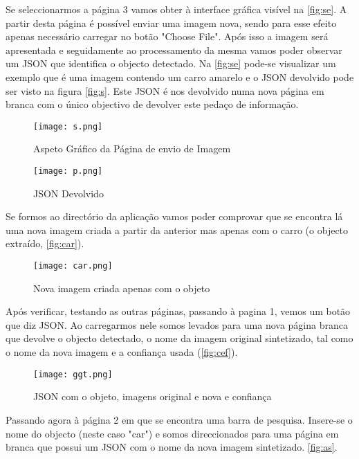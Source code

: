 \documentclass{report}
\begin{document}
Se seleccionarmos a página 3 vamos obter à interface gráfica visível na \autoref{fig:se}. A partir desta página é possível enviar uma imagem nova, sendo para esse efeito apenas necessário carregar no botão "Choose File". Após isso a imagem será apresentada e seguidamente ao processamento da mesma vamos poder observar um JSON que identifica o objecto detectado. Na \autoref{fig:se} pode-se visualizar um exemplo que é uma imagem contendo um carro amarelo e o JSON devolvido pode ser visto na figura \autoref{fig:s}. Este JSON é nos devolvido numa nova página em branca com o único objectivo de devolver este pedaço de informação.

\begin{figure}[h]
\center %
\texttt{[image: s.png]}
\caption{Aspeto Gráfico da Página de envio de Imagem}
\label{fig:se}
\end{figure}


\begin{figure}[h]
\center %
\texttt{[image: p.png]}
\caption{JSON Devolvido}
\label{fig:s}
\end{figure}

Se formos ao directório da aplicação vamos poder comprovar que se encontra lá uma nova imagem criada a partir da anterior mas apenas com o carro (o objecto extraído, \autoref{fig:car}).

\begin{figure}[h]
\center %
\texttt{[image: car.png]}
\caption{Nova imagem criada apenas com o objeto}
\label{fig:car}
\end{figure}

Após verificar, testando as outras páginas, passando à pagina 1, vemos um botão que diz JSON. Ao carregarmos nele somos levados para uma nova página branca que devolve o objecto detectado, o nome da imagem original sintetizado, tal como o nome da nova imagem e a confiança usada (\autoref{fig:cef}).

\begin{figure}[h]
\center %
\texttt{[image: ggt.png]}
\caption{JSON com o objeto, imagens  original e nova e confiança}
\label{fig:cef}
\end{figure}


Passando agora à página 2 em que se encontra uma barra de pesquisa. Insere-se o nome do objecto (neste caso "car") e somos direccionados para uma página em branca que possui um JSON com o nome da nova imagem sintetizado. \autoref{fig:as}.
\end{document}
